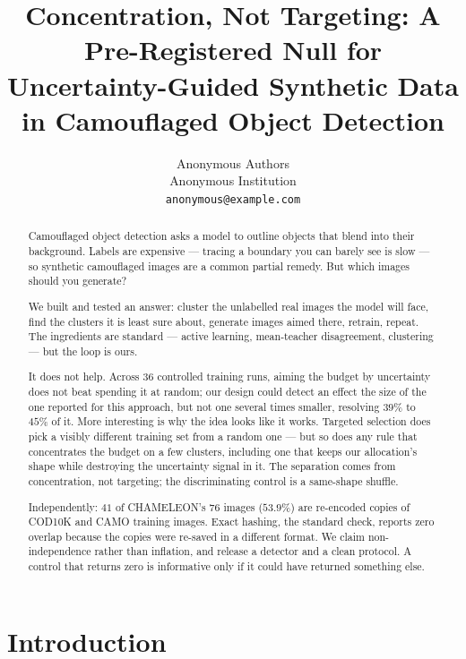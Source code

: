 \documentclass{article} %
\title{Concentration, Not Targeting: A Pre-Registered Null for\\
Uncertainty-Guided Synthetic Data in Camouflaged Object Detection}
\author{Anonymous Authors \\
Anonymous Institution \\
\texttt{anonymous@example.com}
}
\begin{document}
\maketitle

\begin{abstract}
Camouflaged object detection asks a model to outline objects that blend into their background.
Labels are expensive --- tracing a boundary you can barely see is slow --- so synthetic camouflaged
images are a common partial remedy. But which images should you generate?

We built and tested an answer: cluster the unlabelled real images the model will face, find the
clusters it is least sure about, generate images aimed there, retrain, repeat. The ingredients are
standard --- active learning, mean-teacher disagreement, clustering --- but the loop is ours.

It does not help. Across $36$ controlled training runs, aiming the budget by uncertainty does not
beat spending it at random; our design could detect an effect the size of the one reported for this
approach, but not one several times smaller, resolving $39\%$ to $45\%$ of it. More interesting is
why the idea looks like it works. Targeted selection does pick a visibly different training set from
a random one --- but so does any rule that concentrates the budget on a few clusters, including one that keeps our allocation's shape while destroying the uncertainty signal in it. The separation comes from
concentration, not targeting; the discriminating control is a same-shape shuffle.

Independently: $41$ of CHAMELEON's $76$ images ($53.9\%$) are re-encoded copies of COD10K and CAMO
training images. Exact hashing, the standard check, reports zero overlap because the copies were
re-saved in a different format. We claim non-independence rather than inflation, and release a
detector and a clean protocol. A control that returns zero is informative only if it could have
returned something else.
\end{abstract}

\section{Introduction}
\label{sec:intro}
\end{document}
